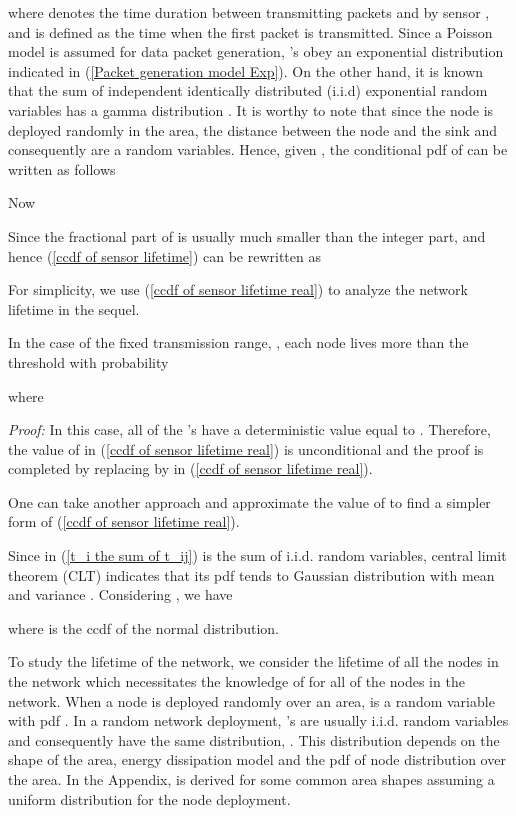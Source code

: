 \documentclass[conference]{IEEEtran}
\begin{document}
where  denotes the time duration between transmitting
packets  and  by sensor , and  is defined as the
time when the first packet is transmitted. Since a Poisson model is
assumed for data packet generation, 's obey an exponential
distribution indicated in (\ref{Packet generation model Exp}). On
the other hand, it is known that the sum of independent identically
distributed (i.i.d) exponential random variables has a gamma
distribution \cite{Ross_Prob}. It is worthy to note that since the
node is deployed randomly in the area, the distance between the node
and the sink and consequently  are a random variables. Hence,
given , the conditional pdf of  can be written as follows

Now
 \hfill 

\prop \label{approx floorP by P} Since the fractional part of 
is usually much smaller than the integer part,  and hence (\ref{ccdf of sensor lifetime}) can be
rewritten as

For simplicity, we use (\ref{ccdf of sensor lifetime
real}) to analyze the network lifetime in the sequel.


\corol \label{Corollary fixed power transmission} In the case of the
fixed transmission range, , each node lives more than the
threshold with probability

where

\textit{Proof:} In this case, all of the 's have a
deterministic value equal to . Therefore, the value of
 in (\ref{ccdf of sensor lifetime real}) is unconditional and
the proof is completed by replacing  by  in (\ref{ccdf of sensor lifetime real}).\hfill 

One can take another approach and approximate the value of  to find a simpler form of (\ref{ccdf of sensor lifetime
real}).

\prop \label{Propositon Q function} Since  in (\ref{t_i the sum of t_ij}) is the sum of i.i.d.
random variables, central limit theorem (CLT)  \cite{Ross_Prob}
indicates that its pdf tends to Gaussian distribution with mean
 and variance . Considering , we
have

where  is the ccdf of the normal distribution. \hfill 

To study the lifetime of the network, we consider the lifetime of
all the nodes in the network which necessitates the knowledge of
 for all of the nodes in the network. When a node is deployed
randomly over an area,  is a random variable with pdf
. In a random network deployment, 's are usually
i.i.d. random variables and consequently have the same distribution,
. This distribution depends on the shape of the area,
energy dissipation model and the pdf of node distribution over the
area. In the Appendix,  is derived for some common area
shapes assuming a uniform distribution for the node deployment.
\end{document}
